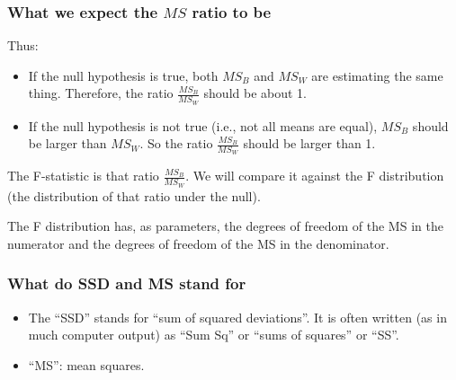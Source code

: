 \documentclass[bigger]{beamer}
\begin{document}
\begin{frame}
  \frametitle{What we expect the $MS$ ratio to be}
  Thus:
    \begin{itemize}
    \item If the null hypothesis is true, both $MS_B$ and $MS_W$ are estimating
      the same thing. Therefore, the ratio $\frac{MS_B}{MS_W}$ should be about 1.
    \item If the null hypothesis is not true (i.e., not all means are equal),
      $MS_B$ should be larger than $MS_W$. So the ratio $\frac{MS_B}{MS_W}$
      should be larger than 1.
    \end{itemize}

    The F-statistic is that ratio  $\frac{MS_B}{MS_W}$. We will compare it
    against the F distribution (the distribution of that ratio under the null).


    \vspace*{10pt}

    {\scriptsize The F distribution
    has, as parameters, the degrees of freedom of the MS in the numerator and the
    degrees of freedom of the MS in the denominator.}
\end{frame}



\begin{frame}
  \frametitle{What do SSD and MS stand for}
  \begin{itemize}
  \item The ``SSD'' stands for ``sum of squared deviations''. It is often written
    (as in much computer output) as ``Sum Sq'' or ``sums of squares'' or ``SS''.
  \item ``MS'': mean squares.
  \end{itemize}
\end{frame}
\end{document}
